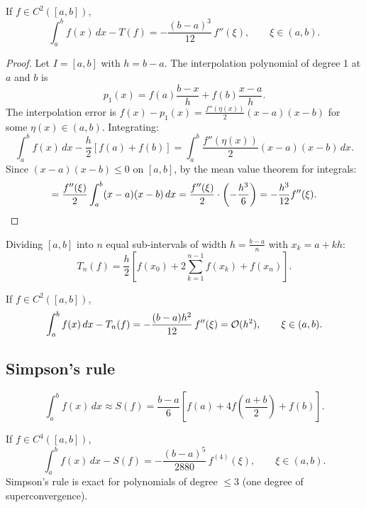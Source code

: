 \begin{theorem}
\label{thm:trap-error}
If $f \in C^2([a,b])$,
\[
    \int_a^b f(x)\,dx - T(f) = -\frac{(b-a)^3}{12}\,f''(\xi), \qquad \xi \in (a,b).
\]
\end{theorem}

\begin{proof}
Let $I = [a,b]$ with $h = b-a$. The interpolation polynomial of degree 1 at $a$ and $b$ is
\[
    p_1(x) = f(a)\frac{b-x}{h} + f(b)\frac{x-a}{h}.
\]
The interpolation error is $f(x) - p_1(x) = \frac{f''(\eta(x))}{2}(x-a)(x-b)$ for some $\eta(x) \in (a,b)$. Integrating:
\[
    \int_a^b f(x)\,dx - \frac{h}{2}[f(a)+f(b)] = \int_a^b \frac{f''(\eta(x))}{2}(x-a)(x-b)\,dx.
\]
Since $(x-a)(x-b) \leq 0$ on $[a,b]$, by the mean value theorem for integrals:
\[
    = \frac{f''(\xi)}{2}\int_a^b (x-a)(x-b)\,dx = \frac{f''(\xi)}{2}\cdot\left(-\frac{h^3}{6}\right) = -\frac{h^3}{12}f''(\xi). \qedhere
\]
\end{proof}

\begin{definition}
\label{def:trap-composite}
Dividing $[a,b]$ into $n$ equal sub-intervals of width $h = \frac{b-a}{n}$ with $x_k = a + kh$:
\[
    T_n(f) = \frac{h}{2}\left[f(x_0) + 2\sum_{k=1}^{n-1} f(x_k) + f(x_n)\right].
\]
\end{definition}

\begin{theorem}
\label{thm:trap-composite-error}
If $f \in C^2([a,b])$,
\[
    \int_a^b f(x)\,dx - T_n(f) = -\frac{(b-a)h^2}{12}\,f''(\xi) = \mathcal{O}(h^2), \qquad \xi \in (a,b).
\]
\end{theorem}

\subsection{Simpson's rule}

\begin{definition}
\label{def:simpson-simple}
\[
    \int_a^b f(x)\,dx \approx S(f) = \frac{b-a}{6}\left[f(a) + 4f\!\left(\frac{a+b}{2}\right) + f(b)\right].
\]
\end{definition}

\begin{theorem}
\label{thm:simpson-error}
If $f \in C^4([a,b])$,
\[
    \int_a^b f(x)\,dx - S(f) = -\frac{(b-a)^5}{2880}\,f^{(4)}(\xi), \qquad \xi \in (a,b).
\]
Simpson's rule is exact for polynomials of degree $\leq 3$ (one degree of superconvergence).
\end{theorem}

